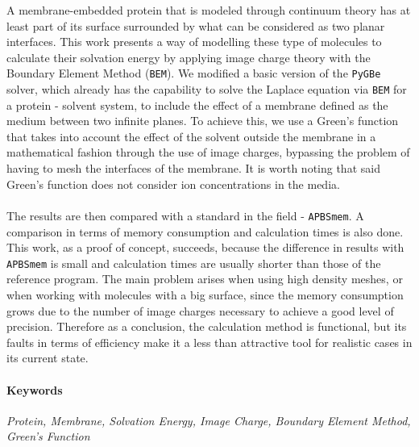 \noindent
A membrane-embedded protein that is modeled through continuum theory has at least part of its surface surrounded by what can be considered as two planar interfaces. This work presents a way of modelling these type of molecules to calculate their solvation energy by applying image charge theory with the Boundary Element Method (\texttt{BEM}). We modified a basic version of the \texttt{PyGBe} solver, which already has the capability to solve the Laplace equation via \texttt{BEM} for a protein - solvent system, to include the effect of a membrane defined as the medium between two infinite planes. To achieve this, we use a Green's function that takes into account the effect of the solvent outside the membrane in a mathematical fashion through the use of image charges, bypassing the problem of having to mesh the interfaces of the membrane. It is worth noting that said Green's function does not consider ion concentrations in the media.\\\\
The results are then compared with a standard in the field - \texttt{APBSmem}. A comparison in terms of memory consumption and calculation times is also done. This work, as a proof of concept, succeeds, because the difference in results with \texttt{APBSmem} is small and calculation times are usually shorter than those  of the reference program. The main problem arises when using high density meshes, or when working with molecules with a big surface, since the memory consumption grows due to the number of image charges necessary to achieve a good level of precision. Therefore as a conclusion, the calculation method is functional, but its faults in terms of efficiency make it a less than attractive tool for realistic cases in its current state.

\paragraph{Keywords} \textit{Protein, Membrane, Solvation Energy, Image Charge, Boundary Element Method, Green's Function}